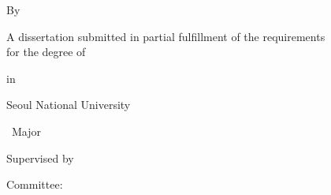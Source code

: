 \clearpage
\centering

{\Large \quad \par}
\vspace{.1cm}
{\Huge \bf \tTitleA \par}
\vspace{.3cm}
{\Huge \bf \tTitleB \par}
\vspace{.5cm}
{\large By \par}
\vspace{0.5cm}
{\Large \bf \tNameWithBlank \par }
\vspace{0.5cm}
{\large A dissertation submitted in partial fulfillment of the requirements \\ for the degree of \par}
\vspace{.5cm}
{\Large \bf \tDegLong \par}
\vspace{.3cm}
{\large in\par}
\vspace{.3cm}
{\Large \tMajor \par}
\vspace{.9cm}

{\large \tCollegeOrGradSchool \par}
\vspace{.2cm}
{\large \tDepartment \par}
\vspace{.2cm}
{\large Seoul National University\par}
\vspace{.2cm}
{\large \tMajor\ Major \par}


\vspace{1cm}
{\large Supervised by $\ $ \tNameSuper \par}
\vspace{1cm}

{\large \tInjunDate \par}
\vspace{1.2cm}
{\large Committee: \qquad\qquad\qquad\qquad\qquad\qquad\qquad\qquad \par}

